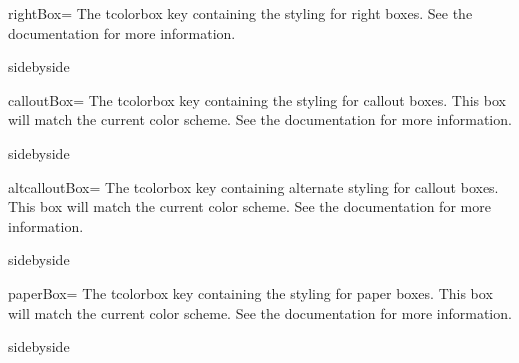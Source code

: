 \documentclass[article,ariandor]{plotweaver}
\begin{document}
\begin{docKey}[tcb][doc updated = 2026-08-16]{rightBox}{=}{}
  The tcolorbox key containing the styling for right boxes. See the  documentation for more information. 
  \begin{dispExample*}{sidebyside}
  \begin{tcolorbox}[rightBox, title={Right Box}]
      \lipsum[1][2]
  \end{tcolorbox}
  \end{dispExample*}
\end{docKey}

\begin{docKey}[tcb][doc new = 2026-08-24]{calloutBox}{=}{}
  The tcolorbox key containing the styling for callout boxes. This box will match the current color scheme. See the  documentation for more information. 
  \begin{dispExample*}{sidebyside}
  \begin{tcolorbox}[calloutBox, title={Callout Box}]
      \lipsum[1][3]
  \end{tcolorbox}
  \end{dispExample*}
\end{docKey}

\begin{docKey}[tcb][doc new = 2026-08-26]{altcalloutBox}{=}{}
  The tcolorbox key containing alternate styling for callout boxes. This box will match the current color scheme. See the  documentation for more information. 
  \begin{dispExample*}{sidebyside}
  \begin{tcolorbox}[altcalloutBox, title={Alt Callout Box}]
      \lipsum[1][3]
  \end{tcolorbox}
  \end{dispExample*}
\end{docKey}

\begin{docKey}[tcb][doc new = 2026-08-26]{paperBox}{=}{}
  The tcolorbox key containing the styling for paper boxes. This box will match the current color scheme. See the  documentation for more information. 
  \begin{dispExample*}{sidebyside}
  \begin{tcolorbox}[paperBox, title={Paper Box}]
      \lipsum[1][4-5]
  \end{tcolorbox}
  \end{dispExample*}
\end{docKey}
\end{document}
